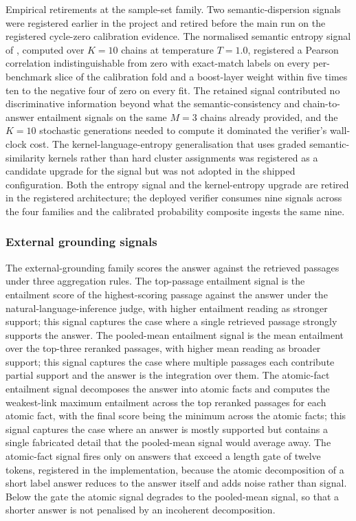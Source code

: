 Empirical retirements at the sample-set family. Two semantic-dispersion signals were registered earlier in the project and retired before the main run on the registered cycle-zero calibration evidence. The normalised semantic entropy signal of \cite{farquhar2024semantic,kuhn2023semantic}, computed over $K=10$ chains at temperature $T=1.0$, registered a Pearson correlation indistinguishable from zero with exact-match labels on every per-benchmark slice of the calibration fold and a boost-layer weight within five times ten to the negative four of zero on every fit. The retained signal contributed no discriminative information beyond what the semantic-consistency and chain-to-answer entailment signals on the same $M=3$ chains already provided, and the $K=10$ stochastic generations needed to compute it dominated the verifier's wall-clock cost. The kernel-language-entropy generalisation that uses graded semantic-similarity kernels rather than hard cluster assignments \cite{nikitin2024kle} was registered as a candidate upgrade for the signal but was not adopted in the shipped configuration. Both the entropy signal and the kernel-entropy upgrade are retired in the registered architecture; the deployed verifier consumes nine signals across the four families and the calibrated probability composite ingests the same nine.

\subsubsection{External grounding signals}
\label{sec:verifier-grounding}

The external-grounding family scores the answer against the retrieved passages under three aggregation rules. The top-passage entailment signal is the entailment score of the highest-scoring passage against the answer under the natural-language-inference judge, with higher entailment reading as stronger support; this signal captures the case where a single retrieved passage strongly supports the answer. The pooled-mean entailment signal is the mean entailment over the top-three reranked passages, with higher mean reading as broader support; this signal captures the case where multiple passages each contribute partial support and the answer is the integration over them. The atomic-fact entailment signal decomposes the answer into atomic facts and computes the weakest-link maximum entailment across the top reranked passages for each atomic fact, with the final score being the minimum across the atomic facts; this signal captures the case where an answer is mostly supported but contains a single fabricated detail that the pooled-mean signal would average away. The atomic-fact signal fires only on answers that exceed a length gate of twelve tokens, registered in the implementation, because the atomic decomposition of a short label answer reduces to the answer itself and adds noise rather than signal. Below the gate the atomic signal degrades to the pooled-mean signal, so that a shorter answer is not penalised by an incoherent decomposition.

